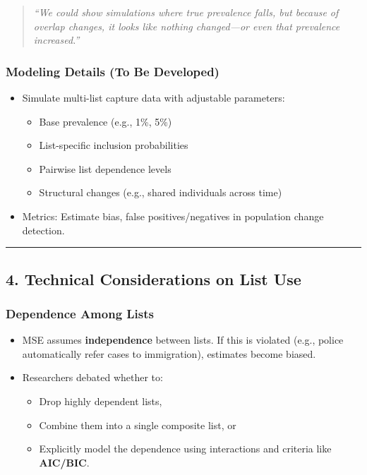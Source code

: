 \documentclass[
  12pt,
]{article}
\theoremstyle{plain}
\theoremstyle{definition}
\begin{document}
\begin{quote}
\emph{``We could show simulations where true prevalence falls, but
because of overlap changes, it looks like nothing changed---or even that
prevalence increased.''}
\end{quote}

\subsubsection{\texorpdfstring{\textbf{Modeling Details (To Be
Developed)}}{Modeling Details (To Be Developed)}}\label{modeling-details-to-be-developed}

\begin{itemize}
\item
  Simulate multi-list capture data with adjustable parameters:

  \begin{itemize}
  \item
    Base prevalence (e.g., 1\%, 5\%)
  \item
    List-specific inclusion probabilities
  \item
    Pairwise list dependence levels
  \item
    Structural changes (e.g., shared individuals across time)
  \end{itemize}
\item
  Metrics: Estimate bias, false positives/negatives in population change
  detection.
\end{itemize}

\begin{center}\rule{0.5\linewidth}{0.5pt}\end{center}

\subsection{\texorpdfstring{\textbf{4. Technical Considerations on List
Use}}{4. Technical Considerations on List Use}}\label{technical-considerations-on-list-use}

\subsubsection{\texorpdfstring{\textbf{Dependence Among
Lists}}{Dependence Among Lists}}\label{dependence-among-lists}

\begin{itemize}
\item
  MSE assumes \textbf{independence} between lists. If this is violated
  (e.g., police automatically refer cases to immigration), estimates
  become biased.
\item
  Researchers debated whether to:

  \begin{itemize}
  \item
    Drop highly dependent lists,
  \item
    Combine them into a single composite list, or
  \item
    Explicitly model the dependence using interactions and criteria like
    \textbf{AIC/BIC}.
  \end{itemize}
\end{itemize}
\end{document}
